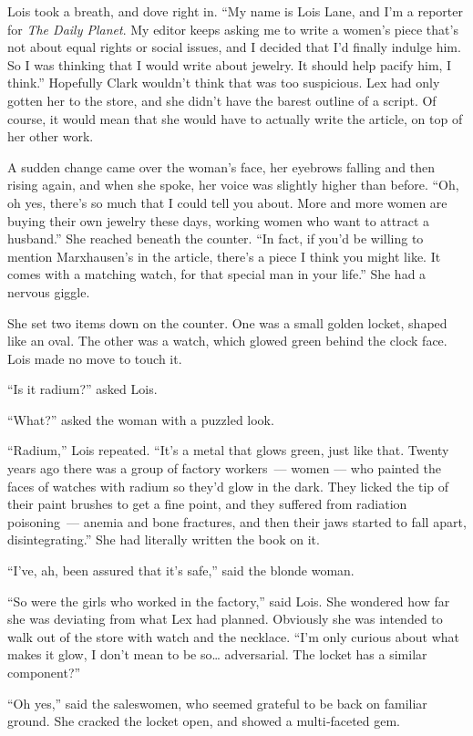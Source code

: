 \documentclass[ebook,12pt]{memoir}
\begin{document}
Lois took a breath, and dove right in. ``My name is Lois Lane, and I'm a
reporter for \emph{The Daily Planet}. My editor keeps asking me to write
a women's piece that's not about equal rights or social issues, and I
decided that I'd finally indulge him. So I was thinking that I would
write about jewelry. It should help pacify him, I think.'' Hopefully
Clark wouldn't think that was too suspicious. Lex had only gotten her to
the store, and she didn't have the barest outline of a script. Of
course, it would mean that she would have to actually write the article,
on top of her other work.

A sudden change came over the woman's face, her eyebrows falling and
then rising again, and when she spoke, her voice was slightly higher
than before. ``Oh, oh yes, there's so much that I could tell you about.
More and more women are buying their own jewelry these days, working
women who want to attract a husband.'' She reached beneath the counter.
``In fact, if you'd be willing to mention Marxhausen's in the article,
there's a piece I think you might like. It comes with a matching watch,
for that special man in your life.'' She had a nervous giggle.

She set two items down on the counter. One was a small golden locket,
shaped like an oval. The other was a watch, which glowed green behind
the clock face. Lois made no move to touch it.

``Is it radium?'' asked Lois.

``What?'' asked the woman with a puzzled look.

``Radium,'' Lois repeated. ``It's a metal that glows green, just like
that. Twenty years ago there was a group of factory workers~--- women
--- who painted the faces of watches with radium so they'd glow in the
dark. They licked the tip of their paint brushes to get a fine point,
and they suffered from radiation poisoning~--- anemia and bone
fractures, and then their jaws started to fall apart, disintegrating.''
She had literally written the book on it.

``I've, ah, been assured that it's safe,'' said the blonde woman.

``So were the girls who worked in the factory,'' said Lois. She wondered
how far she was deviating from what Lex had planned. Obviously she was
intended to walk out of the store with watch and the necklace. ``I'm
only curious about what makes it glow, I don't mean to be so\ldots{}
adversarial. The locket has a similar component?''

``Oh yes,'' said the saleswomen, who seemed grateful to be back on
familiar ground. She cracked the locket open, and showed a multi‐faceted
gem.
\end{document}

